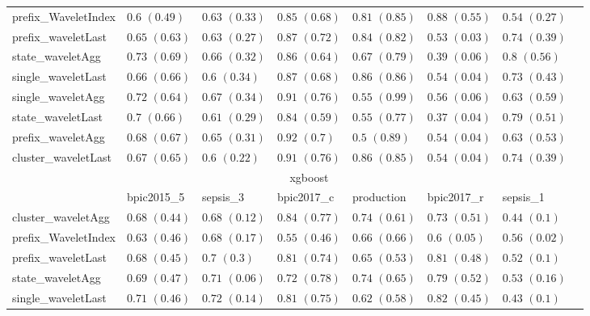 \documentclass[twoside,11pt]{Latex/Classes/PhDthesisPSnPDF}
\begin{document}
\begin{table}[h]
{\begin{tabular}{llllllll}
				prefix\_WaveletIndex & $0.6$ ${(0.49)}$ & $0.63$ ${(0.33)}$ & $0.85$ ${(0.68)}$ & $0.81$ ${(0.85)}$ & $\mathbf{0.88}$ $\mathbf{(0.55)}$  & $0.54$ ${(0.27)}$ \\
				prefix\_waveletLast & $0.65$ ${(0.63)}$ & $0.63$ ${(0.27)}$ & $0.87$ ${(0.72)}$ & $0.84$ ${(0.82)}$ & $0.53$ ${(0.03)}$ & $0.74$ ${(0.39)}$ \\
				state\_waveletAgg & $\mathbf{0.73}$ $\mathbf{(0.69)}$  & $0.66$ ${(0.32)}$ & $0.86$ ${(0.64)}$ & $0.67$ ${(0.79)}$ & $0.39$ ${(0.06)}$ & $0.8$ ${(0.56)}$ \\
				single\_waveletLast & $0.66$ ${(0.66)}$ & $0.6$ ${(0.34)}$ & $0.87$ ${(0.68)}$ & $0.86$ ${(0.86)}$ & $0.54$ ${(0.04)}$ & $0.73$ ${(0.43)}$ \\
				single\_waveletAgg & $0.72$ ${(0.64)}$ & $0.67$ ${(0.34)}$ & $0.91$ ${(0.76)}$ & $0.55$ ${(0.99)}$ & $0.56$ ${(0.06)}$ & $0.63$ ${(0.59)}$ \\
				state\_waveletLast & $0.7$ ${(0.66)}$ & $0.61$ ${(0.29)}$ & $0.84$ ${(0.59)}$ & $0.55$ ${(0.77)}$ & $0.37$ ${(0.04)}$ & $0.79$ ${(0.51)}$ \\
				prefix\_waveletAgg & $0.68$ ${(0.67)}$ & $0.65$ ${(0.31)}$ & $0.92$ ${(0.7)}$ & $0.5$ ${(0.89)}$ & $0.54$ ${(0.04)}$ & $0.63$ ${(0.53)}$ \\
				cluster\_waveletLast & $0.67$ ${(0.65)}$ & $0.6$ ${(0.22)}$ & $0.91$ ${(0.76)}$ & $0.86$ ${(0.85)}$ & $0.54$ ${(0.04)}$ & $0.74$ ${(0.39)}$ \\
				\bottomrule
				\toprule
				& \multicolumn{5}{c}{xgboost}
				\\
				& bpic2015\_5 & sepsis\_3 & bpic2017\_c & production & bpic2017\_r & sepsis\_1
				\\ \midrule
				cluster\_waveletAgg & $0.68$ ${(0.44)}$ & $0.68$ ${(0.12)}$ & $\mathbf{0.84}$ $\mathbf{(0.77)}$  & $\mathbf{0.74}$ $\mathbf{(0.61)}$  & $0.73$ ${(0.51)}$ & $0.44$ ${(0.1)}$ \\
				prefix\_WaveletIndex & $0.63$ ${(0.46)}$ & $0.68$ ${(0.17)}$ & $0.55$ ${(0.46)}$ & $0.66$ ${(0.66)}$ & $0.6$ ${(0.05)}$ & $0.56$ ${(0.02)}$ \\
				prefix\_waveletLast & $0.68$ ${(0.45)}$ & $0.7$ ${(0.3)}$ & $0.81$ ${(0.74)}$ & $0.65$ ${(0.53)}$ & $0.81$ ${(0.48)}$ & $0.52$ ${(0.1)}$ \\
				state\_waveletAgg & $0.69$ ${(0.47)}$ & $0.71$ ${(0.06)}$ & $0.72$ ${(0.78)}$ & $\mathbf{0.74}$ $\mathbf{(0.65)}$  & $0.79$ ${(0.52)}$ & $0.53$ ${(0.16)}$ \\
				single\_waveletLast & $0.71$ ${(0.46)}$ & $0.72$ ${(0.14)}$ & $0.81$ ${(0.75)}$ & $0.62$ ${(0.58)}$ & $0.82$ ${(0.45)}$ & $0.43$ ${(0.1)}$ \\

\end{tabular}}
\end{table}
\end{document}
